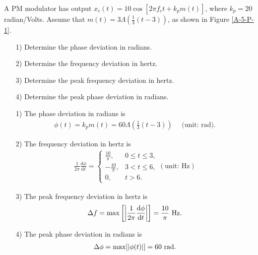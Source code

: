 \documentclass{assignment}
\begin{document}
\begin{prob}
    A PM modulator has output $x_c(t)=10\cos[2\pi f_ct+k_pm(t)]$, where $k_p=20$ radian/Volts. Assume that $m(t)=3\Lambda\left(\frac{1}{3}(t-3)\right)$, as shown in Figure \ref{A-5-P-1}.
    \begin{itemize}
        \item[1)] Determine the phase deviation in radians.
        \item[2)] Determine the frequency deviation in hertz.
        \item[3)] Determine the peak frequency deviation in hertz.
        \item[4)] Determine the peak phase deviation in radians.
    \end{itemize}
\end{prob}
\begin{sol}
    \begin{itemize}
        \item[1)] The phase deviation in radians is
        \begin{align}
            \phi(t)=k_pm(t)=60\Lambda\left(\frac{1}{3}(t-3)\right)\quad\text{ (unit: rad)}.
        \end{align}
        \item[2)] The frequency deviation in hertz is
        \begin{align}
            \frac{1}{2\pi}\frac{\mathrm{d}\phi}{\mathrm{d}t}=\left\{\begin{array}{ll}
                \frac{10}{\pi},&0\leq t\leq 3,\\
                -\frac{10}{\pi},&3< t\leq 6,\\
                0,&t>6.
            \end{array}\right.(\text{unit: Hz})
        \end{align}
        \item[3)] The peak frequency deviation in hertz is
        \begin{align}
            \Delta f=\max\left[\left\lvert\frac{1}{2\pi}\frac{\mathrm{d}\phi}{\mathrm{d}t}\right\rvert\right]=\frac{10}{\pi}\text{ Hz}.
        \end{align}
        \item[4)] The peak phase deviation in radians is
        \begin{align}
            \Delta\phi=\max[\left\lvert\phi(t)\right\rvert]=60\text{ rad}.
        \end{align}
    \end{itemize}
\end{sol}
\end{document}
